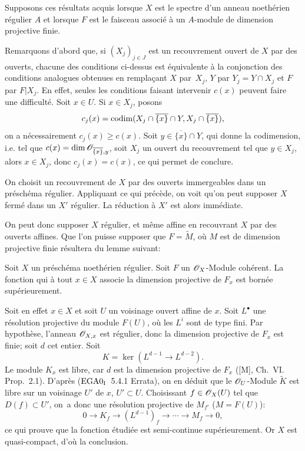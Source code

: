 Supposons ces r\'esultats acquis lorsque $X$ est le spectre d'un anneau noeth\'erien r\'egulier $A$ et lorsque $F$ est le faisceau associ\'e \`a un $A$-module de dimension projective finie.

Remarquons d'abord que, si $(X_j)_{j\in
J}$ est un recouvrement ouvert de $X$ par des ouverts, chacune des conditions
ci-dessus est \'equivalente \`a la conjonction des conditions
analogues obtenues en rempla\c cant $X$ par~$X_j$, $Y$ par
$Y_j=Y\cap X_j$ et $F$ par
$F{|X_j}$. En effet, seules les conditions
faisant intervenir $c(x)$ peuvent faire une difficult\'e. Soit $x\in
U$. Si $x\in X_j$, posons
\[
c_j(x)=\operatorname{codim}(X_j\cap \overline{\{x\}}\cap Y, X_j\cap\overline{\{x\}}),
\]
on a n\'ecessairement $c_j(x)\geq c(x)$. Soit $y\in
\overline{\{x\}}\cap Y$, qui \og donne la codimension\fg, i.e. tel
que $c(x)=\dim {\mathscr O}_{\overline{\{x\}}, y}$, soit $X_j$ un ouvert du
recouvrement tel que $y\in X_j$, alors $x\in X_j$, donc
$c_j(x)=c(x)$, ce qui permet de conclure.

On choisit un recouvrement de $X$ par des ouverts immergeables dans un pr\'esch\'ema r\'egulier. Appliquant ce qui pr\'ec\`ede, on voit qu'on peut supposer $X$ ferm\'e dans un $X'$ r\'egulier. La r\'eduction \`a $X'$ est alors imm\'ediate.

On peut donc supposer $X$ r\'egulier, et m\^eme affine en recouvrant $X$ par des ouverts affines. Que l'on puisse supposer que $F=\widetilde{M}$, o\`u $M$ est de dimension projective finie r\'esultera du lemme suivant:

\begin{lemme} \label{VIII.2.4}
Soit $X$ un pr\'esch\'ema noeth\'erien r\'egulier. Soit $F$ un $\mathscr{O}_X$-Module coh\'erent. La fonction qui \`a tout $x\in X$ associe la dimension projective de $F_x$ est born\'ee sup\'erieurement.
\end{lemme}

\setcounter{equation}{1}

Soit en effet $x\in X$ et soit $U$ un voisinage ouvert affine de $x$. Soit $L^\bullet$ une r\'esolution projective du module $F(U)$, o\`u les $L^i$ sont de type fini. Par hypoth\`ese, l'anneau ${\mathscr O}_{X, x}$ est r\'egulier, donc la dimension projective de $F_x$ est finie; soit $d$ cet entier. Soit
\[
K=\ker(L^{d-1}\to L^{d-2}).
\]
Le module $K_x$ est libre, car $d$ est la dimension projective de $F_x$ ([M], Ch.\, VI. Prop.\, 2.1). D'apr\`es ($\textup{EGA}\space 0_{\textup{I}}$~5.4.1 Errata), on en d\'eduit que le ${\mathscr O}_U$-Module $\widetilde{K}$ est libre sur un voisinage $U'$ de $x$, $U'\subset U$. Choisissant $f\in \mathscr{O}_X(U)$ tel que $D(f)\subset U'$, on~a donc une r\'esolution projective de $M_{f'}$ ($M=F(U)$):
\[0\to K_f \to (L^{d-1})_f\to \cdots \to M_f\to 0, \]
ce qui prouve que la fonction \'etudi\'ee est semi-continue sup\'erieurement. Or $X$ est quasi-compact, d'o\`u la conclusion.

